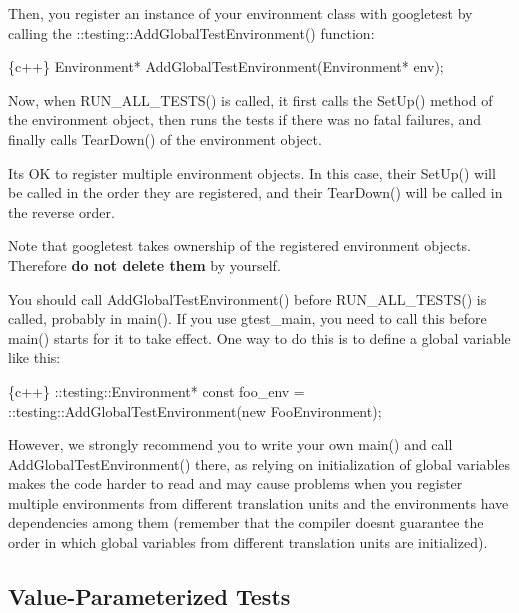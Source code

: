 Then, you register an instance of your environment class with googletest by calling the {\ttfamily \+::testing\+::\+Add\+Global\+Test\+Environment()} function\+:


\begin{DoxyCode}
\{c++\}
Environment* AddGlobalTestEnvironment(Environment* env);
\end{DoxyCode}


Now, when {\ttfamily R\+U\+N\+\_\+\+A\+L\+L\+\_\+\+T\+E\+S\+T\+S()} is called, it first calls the {\ttfamily Set\+Up()} method of the environment object, then runs the tests if there was no fatal failures, and finally calls {\ttfamily Tear\+Down()} of the environment object.

It\textquotesingle{}s OK to register multiple environment objects. In this case, their {\ttfamily Set\+Up()} will be called in the order they are registered, and their {\ttfamily Tear\+Down()} will be called in the reverse order.

Note that googletest takes ownership of the registered environment objects. Therefore {\bfseries do not delete them} by yourself.

You should call {\ttfamily Add\+Global\+Test\+Environment()} before {\ttfamily R\+U\+N\+\_\+\+A\+L\+L\+\_\+\+T\+E\+S\+T\+S()} is called, probably in {\ttfamily main()}. If you use {\ttfamily gtest\+\_\+main}, you need to call this before {\ttfamily main()} starts for it to take effect. One way to do this is to define a global variable like this\+:


\begin{DoxyCode}
\{c++\}
::testing::Environment* const foo\_env =
    ::testing::AddGlobalTestEnvironment(new FooEnvironment);
\end{DoxyCode}


However, we strongly recommend you to write your own {\ttfamily main()} and call {\ttfamily Add\+Global\+Test\+Environment()} there, as relying on initialization of global variables makes the code harder to read and may cause problems when you register multiple environments from different translation units and the environments have dependencies among them (remember that the compiler doesn\textquotesingle{}t guarantee the order in which global variables from different translation units are initialized).

\subsection*{Value-\/\+Parameterized Tests}

